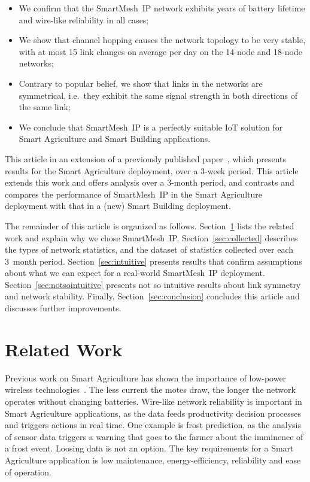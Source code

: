 \documentclass{elsarticle}
\newcommand{\smip}                {SmartMesh~IP\xspace}
\newcommand{\building}            {Smart Building\xspace}
\newcommand{\agri}                {Smart Agriculture\xspace}
\begin{document}
\begin{itemize}
    \item We confirm that the \smip network exhibits years of battery lifetime and wire-like reliability in all cases;
    \item We show that channel hopping causes the network topology to be very stable, with at most 15 link changes on average per day on the 14-node and 18-node networks;
    \item Contrary to popular belief, we show that links in the networks are symmetrical, i.e.~they exhibit the same signal strength in both directions of the same link;
    \item We conclude that \smip is a perfectly suitable IoT solution for \agri and \building applications.
\end{itemize}


This article in an extension of a previously published paper~\cite{brun16intuitive}, which presents results for the \agri deployment, over a 3-week period.
This article extends this work and offers analysis over a 3-month period, and contrasts and compares the performance of \smip in the \agri deployment with that in a (new) \building deployment.


The remainder of this article is organized as follows.
Section~\ref{sec:related} lists the related work and explain why we chose \smip.
Section~\ref{sec:collected} describes the types of network statistics, and the dataset of statistics collected over each 3~month period.
Section~\ref{sec:intuitive} presents results that confirm assumptions about what we can expect for a real-world \smip deployment.
Section~\ref{sec:notsointuitive} presents not so intuitive results about link symmetry and network stability.
Finally, Section~\ref{sec:conclusion} concludes this article and discusses further improvements.

\section{Related Work}
\label{sec:related}


Previous work on \agri has shown the importance of low-power wireless technologies~\cite{ojha15wireless}.
The less current the motes draw, the longer the network operates without changing batteries.
Wire-like network reliability is important in \agri applications, as the data feeds productivity decision processes and triggers actions in real time.
One example is frost prediction, as the analysis of sensor data triggers a warning that goes to the farmer about the imminence of a frost event.
Loosing data is not an option.
The key requirements for a \agri application is low maintenance, energy-efficiency, reliability and ease of operation.
\end{document}
